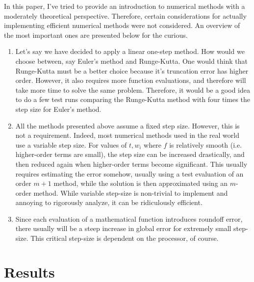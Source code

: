 \documentclass{article}
\newcommand{\0}{\vb{0}}
\begin{document}
In this paper, I've tried to provide an introduction to numerical methods with a moderately theoretical perspective. Therefore, certain considerations for actually implementing efficient numerical methods were not considered. An overview of the most important ones are presented below for the curious.

\begin{enumerate}
  \item Let's say we have decided to apply a linear one-step method. How would we choose between, say Euler's method and Runge-Kutta. One would think that Runge-Kutta must be a better choice because it's truncation error has higher order. However, it also requires more function evaluations, and therefore will take more time to solve the same problem. Therefore, it would be a good idea to do a few test runs comparing the Runge-Kutta method with four times the step size for Euler's method.
  \item All the methods presented above assume a fixed step size. However, this is not a requirement. Indeed, most numerical methods used in the real world use a variable step size. For values of $t, w_i$ where $f$ is relatively smooth (i.e. higher-order terms are small), the step size can be increased drastically, and then reduced again when higher-order terms become significant. This usually requires estimating the error somehow, usually using a test evaluation of an order $m+1$ method, while the solution is then approximated using an $m$-order method. While variable step-size is non-trivial to implement and annoying to rigorously analyze, it can be ridiculously efficient.
  \item Since each evaluation of a mathematical function introduces roundoff error, there usually will be a steep increase in global error for extremely small step-size. This critical step-size is dependent on the processor, of course.
\end{enumerate}

\section{Results}
\end{document}
